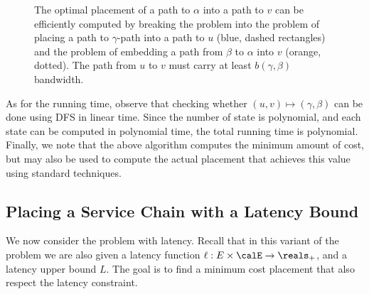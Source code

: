 \begin{figure}[t]
\centering
{}
\caption[\scp{} - Dynamic programming illustration]{The optimal placement of a path to $\alpha$ into a path to
  $v$ can be efficiently computed by breaking the problem into the
  problem of placing a path to $\gamma$-path into a path to $u$ (blue,
  dashed rectangles) and the problem of embedding a path from $\beta$
  to $\alpha$ into $v$ (orange, dotted).  The path from $u$ to $v$
  must carry at least $b(\gamma,\beta)$ bandwidth.  }
\label{fig:dp1}
\end{figure}

As for the running time, observe that checking whether $(u, v) \mapsto
(\gamma,\beta)$ can be done using DFS in linear time.
%
Since the number of state is polynomial, and each state can be
computed in polynomial time, the total running time is polynomial.
Finally, we note that the above algorithm computes the minimum amount
of cost, but may also be used to compute the actual placement
that achieves this value using standard techniques.


\subsection{Placing a Service Chain with a Latency Bound}
\label{sub:DPL}

We now consider the \scp problem with latency.  Recall that in this
variant of the problem we are also given a latency function $\ell: E
\times \calE \to \reals_+$, and a latency upper bound $L$.  The goal
is to find a minimum cost placement that also respect the latency
constraint.

